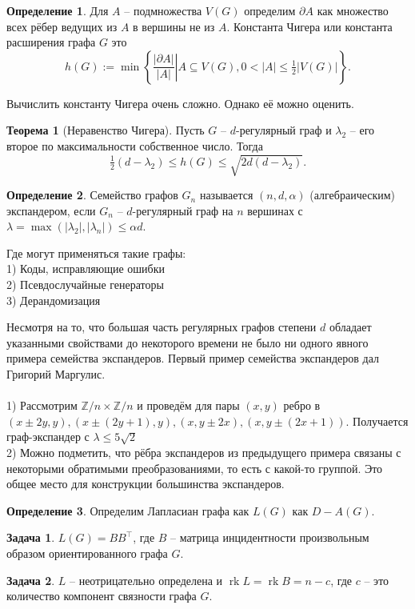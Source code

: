\documentclass[12pt,a4paper,oneside]{book}
\theoremstyle{definition}
\newtheorem{zad}{\color{violet!100!black}Задача}
\newtheorem*{defn}{\color{yellow!30!red} Определение}
\newtheorem*{thmm}{\color{red!40!black} Теорема}
\renewcommand{\leq}{\leqslant}
\newcommand{\rk}{\operatorname{rk}}
\newcommand{\Z}{\mathbb Z}
\def\exm{\noindent {\bf Примеры:}}
\def\dfn{\begin{defn}}
\def\edfn{\end{defn}}
\def\zd{\begin{zad}}
\def\ezd{\end{zad}}
\begin{document}
\dfn Для $A$ -- подмножества $V(G)$ определим $\partial A$ как множество всех рёбер ведущих из $A$ в вершины не из $A$. Константа Чигера или константа расширения графа  $G$ это 
$$h(G) := \min \left\{ \left. \frac{| \partial A |}{| A |} \right|   A \subseteq V(G), 0 < | A | \leq \tfrac{1}{2} | V(G)| \right\} .$$
\edfn

Вычислить константу Чигера очень сложно. Однако её можно оценить.

\begin{thmm}[Неравенство Чигера] Пусть $G$ -- $d$-регулярный граф и $\lambda_2$ -- его второе по максимальности собственное число. Тогда
$$\tfrac{1}{2}(d - \lambda_2) \le h(G) \le \sqrt{2d(d - \lambda_2)}.$$
\end{thmm}



\dfn Семейство графов $G_n$ называется $(n,d,\alpha)$ (алгебраическим) экспандером, если $G_n$ -- $d$-регулярный граф на $n$ вершинах с $\lambda=\max(|\lambda_2|,|\lambda_n|)\leq \alpha d$.
\edfn

Где могут применяться такие графы:\\
1) Коды, исправляющие ошибки\\
2) Псевдослучайные генераторы\\
3) Дерандомизация

Несмотря на то, что большая часть регулярных графов степени $d$ обладает указанными свойствами  до некоторого времени не было ни одного явного примера семейства экспандеров. Первый пример семейства экспандеров дал Григорий Маргулис. \\


\exm\\
1) Рассмотрим $\Z/n \times \Z/n$ и проведём для пары $(x,y)$ ребро в $(x \pm 2y,y), (x \pm (2y+1),y), (x,y \pm 2x), (x,y \pm (2x+1))$. Получается граф-экспандер с $\lambda \leq 5\sqrt{2}$\\
2) Можно подметить, что рёбра экспандеров из предыдущего примера связаны с некоторыми обратимыми преобразованиями, то есть с какой-то группой. Это общее место для конструкции большинства экспандеров.



\dfn Определим Лапласиан графа как $L(G)$ как $D-A(G)$.
\edfn

\zd $L(G)=B B^\top$, где $B$ -- матрица инцидентности произвольным образом ориентированного графа $G$.
\ezd

\zd $L$ -- неотрицательно определена и  $\rk L= \rk B=n-c$, где $c$ -- это количество компонент связности графа $G$.
\ezd
\end{document}
